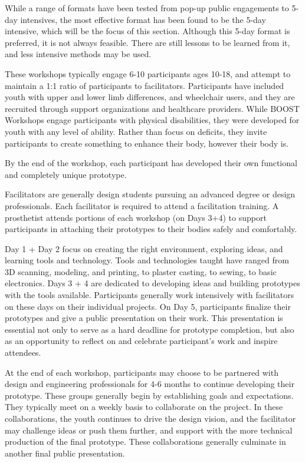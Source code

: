 \documentclass[11.5pt]{sig-alternate} %
\begin{document}
\begin{large}
While a range of formats have been tested from pop-up public engagements to 5-day intensives, the most effective format has been found to be the 5-day intensive, which will be the focus of this section. Although this 5-day format is preferred, it is not always feasible. There are still lessons to be learned from it, and less intensive methods may be used.   

These workshops typically engage 6-10 participants ages 10-18, and attempt to maintain a 1:1 ratio of participants to facilitators. Participants have included youth with upper and lower limb differences, and wheelchair users, and they are recruited through support organizations and healthcare providers. While BOOST Workshops engage participants with physical disabilities, they were developed for youth with any level of ability. Rather than focus on deficits, they invite participants to create something to enhance their body, however their body is. 

By the end of the workshop, each participant has developed their own functional and completely unique prototype.  

Facilitators are generally design students pursuing an advanced degree or design professionals. Each facilitator is required to attend a facilitation training. A prosthetist attends portions of each workshop (on Days 3+4) to support participants in attaching their prototypes to their bodies safely and comfortably. 

Day 1 + Day 2 focus on creating the right environment, exploring ideas, and learning tools and technology. Tools and technologies taught have ranged from 3D scanning, modeling, and printing, to plaster casting, to sewing, to basic electronics. Days 3 + 4 are dedicated to developing ideas and building prototypes with the tools available. Participants generally work intensively with facilitators on these days on their individual projects. On Day 5, participants finalize their prototypes and give a public presentation on their work. This presentation is essential not only to serve as a hard deadline for prototype completion, but also as an opportunity to reflect on and celebrate participant’s work and inspire attendees. 

At the end of each workshop, participants may choose to be partnered with design and engineering professionals for 4-6 months to continue developing their prototype. These groups generally begin by establishing goals and expectations. They typically meet on a weekly basis to collaborate on the project. In these collaborations, the youth continues to drive the design vision, and the facilitator may challenge ideas or push them further, and support with the more technical production of the final prototype. These collaborations generally culminate in another final public presentation.   


\end{large}
\end{document}
